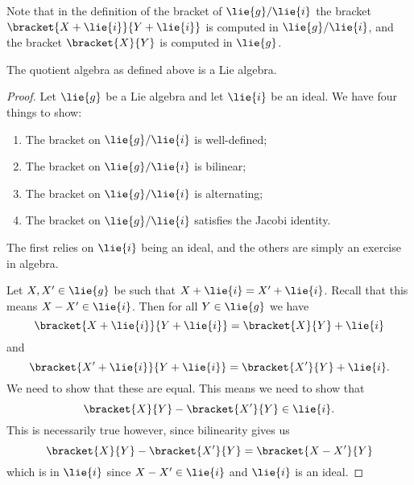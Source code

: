 \documentclass[fleqn]{NotesClass}
\begin{document}
    Note that in the definition of the bracket of \(\lie{g}/\lie{i}\) the bracket \(\bracket{X + \lie{i}}{Y + \lie{i}}\) is computed in \(\lie{g}/\lie{i}\), and the bracket \(\bracket{X}{Y}\) is computed in \(\lie{g}\).
    
    \begin{lma}{}{}
        The quotient algebra as defined above is a Lie algebra.
        \begin{proof}
            Let \(\lie{g}\) be a Lie algebra and let \(\lie{i}\) be an ideal.
            We have four things to show:
            \begin{enumerate}
                \item The bracket on \(\lie{g}/\lie{i}\) is well-defined;
                \item The bracket on \(\lie{g}/\lie{i}\) is bilinear;
                \item The bracket on \(\lie{g}/\lie{i}\) is alternating;
                \item The bracket on \(\lie{g}/\lie{i}\) satisfies the Jacobi identity.
            \end{enumerate}
            The first relies on \(\lie{i}\) being an ideal, and the others are simply an exercise in algebra.
            
            Let \(X, X' \in \lie{g}\) be such that \(X + \lie{i} = X' + \lie{i}\).
            Recall that this means \(X - X' \in \lie{i}\).
            Then for all \(Y \in \lie{g}\) we have
            \begin{equation}
                \bracket{X + \lie{i}}{Y + \lie{i}} = \bracket{X}{Y} + \lie{i}
            \end{equation}
            and
            \begin{equation}
                \bracket{X' + \lie{i}}{Y + \lie{i}} = \bracket{X'}{Y} + \lie{i}.
            \end{equation}
            We need to show that these are equal.
            This means we need to show that
            \begin{equation}
                \bracket{X}{Y} - \bracket{X'}{Y} \in \lie{i}.
            \end{equation}
            This is necessarily true however, since bilinearity gives us
            \begin{equation}
                \bracket{X}{Y} - \bracket{X'}{Y} = \bracket{X - X'}{Y}
            \end{equation}
            which is in \(\lie{i}\) since \(X - X' \in \lie{i}\) and \(\lie{i}\) is an ideal.
            

\end{proof}
\end{lma}
\end{document}
